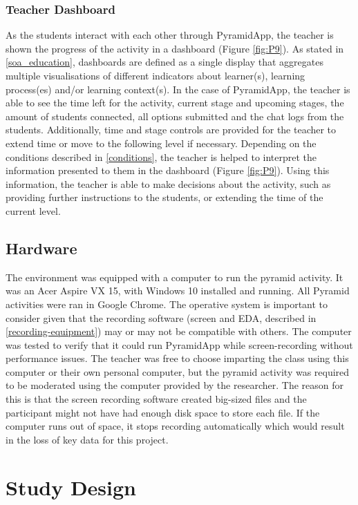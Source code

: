 \subsubsection{Teacher Dashboard}
As the students interact with each other through PyramidApp, the teacher is shown the progress of the activity in a dashboard (Figure \ref{fig:P9}). As stated in \ref{soa_education}, dashboards are defined as a single display that aggregates multiple visualisations of different indicators about learner(s), learning process(es) and/or learning context(s). In the case of PyramidApp, the teacher is able to see the time left for the activity, current stage and upcoming stages, the amount of students connected, all options submitted and the chat logs from the students. Additionally, time and stage controls are provided for the teacher to extend time or move to the following level if necessary. Depending on the conditions described in \ref{conditions}, the teacher is helped to interpret the information presented to them in the dashboard (Figure \ref{fig:P9}). Using this information, the teacher is able to make decisions about the activity, such as providing further instructions to the students, or extending the time of the current level.

\subsection{Hardware}
The environment was equipped with a computer to run the pyramid activity. It was an Acer Aspire VX 15, with Windows 10 installed and running. All Pyramid activities were ran in Google Chrome. The operative system is important to consider given that the recording software (screen and EDA, described in \ref{recording-equipment}) may or may not be compatible with others. The computer was tested to verify that it could run PyramidApp while screen-recording without performance issues. 
The teacher was free to choose imparting the class using this computer or their own personal computer, but the pyramid activity was required to be moderated using the computer provided by the researcher. The reason for this is that the screen recording software created big-sized files and the participant might not have had enough disk space to store each file. If the computer runs out of space, it stops recording automatically which would result in the loss of key data for this project.
\section{Study Design}
